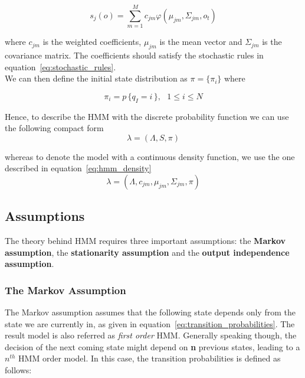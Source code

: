 \begin{equation}
	s_{j}(o) = \sum_{m = 1}^{M} c_{jm}\varphi (\mu_{jm}, \Sigma_{jm}, o_{t})
\end{equation}

\noindent where $c_{jm}$ is the weighted coefficients, $\mu_{jm}$ is the mean vector and $\Sigma_{jm}$ is the covariance matrix. The coefficients should satisfy the stochastic rules in equation~\ref{eq:stochastic_rules}. \\
\noindent We can then define the initial state distribution as $\pi = \{\pi_{i}\}$ where

\begin{equation}
	\pi_{i} = p \, \{ q_{I} = i \, \}, \,\,\,\, 1 \leq i \leq N
\end{equation}

\noindent Hence, to describe the HMM with the discrete probability function we can use the following compact form
\begin{equation}
\label{eq:hmm_discrete}
	\lambda = (\Lambda, S, \pi )
\end{equation}

\noindent whereas to denote the model with a continuous density function, we use the one described in equation~\ref{eq:hmm_density}
\begin{equation}
\label{eq:hmm_density}
\lambda = (\Lambda, c_{jm}, \mu_{jm}, \Sigma_{jm}, \pi )
\end{equation}

\subsection{Assumptions}
\label{sub:assumptions_hmm}
The theory behind HMM requires three important assumptions: the \textbf{Markov assumption}, the \textbf{stationarity assumption} and the \textbf{output independence assumption}.

\subsubsection{The Markov Assumption}
The Markov assumption assumes that the following state depends only from the state we are currently in, as given in equation~\ref{eq:transition_probabilities}. The result model is also referred as \textit{first order} HMM. Generally speaking though, the decision of the next coming state might depend on \textbf{n} previous states, leading to a $n^{th}$ HMM order model. In this case, the transition probabilities is defined as follows:

